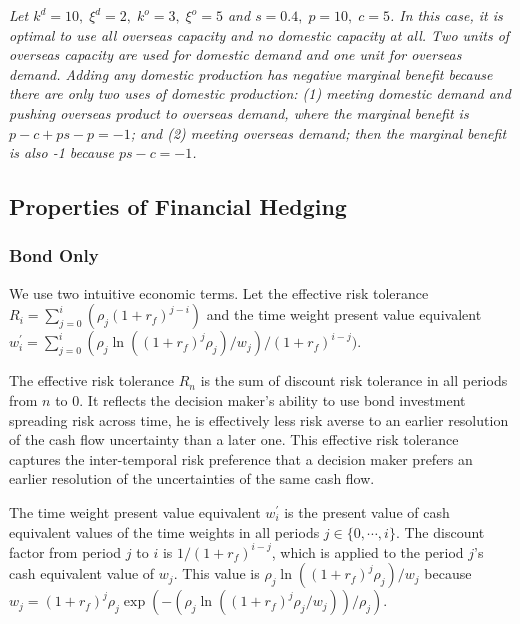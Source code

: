 \documentclass[mnsc,nonblindrev,copyedit]{informs2_wz} %
\begin{document}
\medskip


 {\em Let $k^d = 10,\; \xi^d = 2, \; k^o = 3,\; \xi^o = 5 $ and $s = 0.4, \; p = 10,\; c = 5$.  In this case, it is optimal to use all overseas capacity and no domestic capacity at all.  Two units of overseas capacity are used for domestic demand and one unit for overseas demand.  Adding any domestic production has negative marginal benefit because there are only two uses of domestic production: (1) meeting domestic demand and pushing overseas product to overseas demand, where the marginal benefit is $p-c + ps - p = -1$; and (2) meeting overseas demand; then the marginal benefit is also -1 because $ ps - c = -1$.}




\subsection{Properties of Financial Hedging}





\subsubsection{Bond Only}


We use two intuitive economic terms.  Let the effective risk tolerance $R_i =\sum_{j=0}^i (\rho_j(1+r_f)^{j-i})$ and the time weight present value equivalent $w^\prime_i = \sum_{j=0}^i(\rho_j \ln((1+r_f)^j \rho_j)/w_j)/(1+r_f)^{i-j})$.

The effective risk tolerance $R_n$ is the sum of discount risk tolerance in all periods from $n$ to $0$. It reflects the decision maker's ability to use bond investment spreading risk across time, he is effectively less risk averse to an earlier resolution of the cash flow uncertainty than a later one. This effective risk tolerance captures the inter-temporal risk preference that a decision maker prefers an earlier resolution of the uncertainties of the same cash flow.

The time weight present value equivalent $w^\prime_i$ is the present value of cash equivalent values of the time weights in all periods $j \in \{0, \cdots, i\}$.
The discount factor from period $j$ to $i$ is $1/(1+r_f)^{i-j}$, which is applied to the period $j$'s cash equivalent value of $w_j$. This value is $\rho_j\ln ((1+r_f)^j\rho_j)/w_j$ because $w_j = (1+r_f)^j \rho_j \exp(-(\rho_j\ln ((1+r_f)^j\rho_j/w_j))/\rho_j)$.
\end{document}

